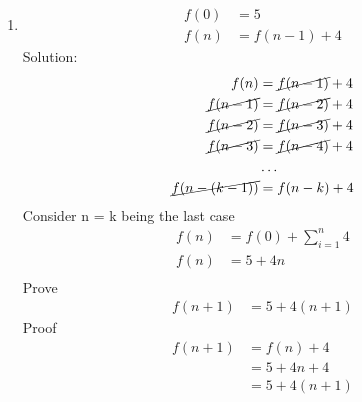 \documentclass{article}
\begin{document}
\begin{enumerate}
\item
  \begin{align*}
    f(0) &= 5\\
    f(n) &= f(n-1) + 4
  \end{align*}
  Solution:
  \begin{align*}
    f(n) &= \cancel{f(n-1)}+4\\ 
    \cancel{f(n-1)} &= \cancel{f(n-2)} +4\\ 
    \cancel{f(n-2)} &= \cancel{f(n-3)} +4\\
    \cancel{f(n-3)} &= \cancel{f(n-4)} +4\\
    &\ldots\\
    \cancel{f(n-(k-1))} &= f(n-k)+4
  \end{align*}
  Consider n = k being the last case
  \begin{align*}
    f(n) &= f(0)+ \sum_{i=1}^{n}4 \\
    f(n) &= 5 + 4n \\
  \end{align*}
  Prove
  \begin{align*}
    f(n+1) &= 5 + 4(n + 1)
  \end{align*}
  Proof
  \begin{align*}
    f(n+1) &= f(n) + 4 \\
    &=  5 + 4n + 4 \\
    &=  5 + 4(n + 1)\\
  \end{align*}


\end{enumerate}
\end{document}
